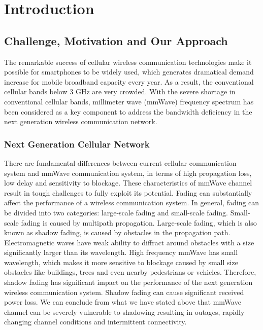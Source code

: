 \chapter{Introduction}\label{ch:Intro}
\section{Challenge, Motivation and Our Approach}
\par The remarkable success of cellular wireless communication technologies make it possible for smartphones to be widely used, which generates dramatical demand increase for mobile broadband capacity every year.  As a result, the conventional cellular bands below 3 GHz are very crowded. With the severe shortage in conventional cellular bands, millimeter wave (mmWave)  frequency spectrum has been considered as a key component to address the bandwidth deficiency in the next generation wireless communication network.  
\subsection{Next Generation Cellular Network}
\par There are fundamental differences between current cellular communication system and mmWave communication system, in terms of high propagation loss, low delay and sensitivity to blockage.  These characteristics of mmWave channel result in tough challenges to fully exploit its potential. Fading can substantially affect the performance of a wireless communication system. In general, fading can be divided into two categories: large-scale fading and small-scale fading. Small-scale fading is caused by multipath propagation. Large-scale fading, which is also known as shadow fading, is caused by obstacles in the propagation path. Electromagnetic waves have weak ability to diffract around obstacles with a size significantly larger than its wavelength. High frequency mmWave has small wavelength, which makes it more sensitive to blockage caused by small size obstacles like buildings, trees and even nearby pedestrians or vehicles. Therefore, shadow fading has significant impact on the performance of the next generation wireless communication system. Shadow fading can cause significant received power loss. We can conclude from what we have stated above that mmWave channel can be severely vulnerable to shadowing resulting in outages, rapidly changing channel conditions and intermittent connectivity. 

